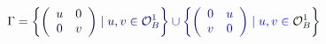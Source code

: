 \documentclass[12pt]{article}
\begin{document}
\makeatletter
\renewcommand*{\@textcolor}[3]{%
  \protect\leavevmode
  \begingroup
    \color#1{#2}#3%
  \endgroup
}
\makeatother
\begin{displaymath}
\mathcolor[RGB]{0,0,15}{\Gamma=\left\{\left(\begin{array}{cc}
u} & \mathcolor[RGB]{0,0,30}{0} \mathcolor[RGB]{0,0,45}{\\
0} & \mathcolor[RGB]{0,0,60}{v
\end{array}\right)} \mathcolor[RGB]{0,0,75}{\mid} \mathcolor[RGB]{0,0,90}{u,} \mathcolor[RGB]{0,0,105}{v} \mathcolor[RGB]{0,0,120}{\in} \mathcolor[RGB]{0,0,135}{\mathcal{O}_{B}^{1}\right\}} \mathcolor[RGB]{0,0,150}{\cup\left\{\left(\begin{array}{cc}
0} & \mathcolor[RGB]{0,0,165}{u} \mathcolor[RGB]{0,0,180}{\\
v} & \mathcolor[RGB]{0,0,195}{0
\end{array}\right)} \mathcolor[RGB]{0,0,210}{\mid} \mathcolor[RGB]{0,0,225}{u,} \mathcolor[RGB]{0,0,240}{v} \mathcolor[RGB]{0,0,255}{\in} \mathcolor[RGB]{0,15,0}{\mathcal{%
O}_{B}^{1}\right\}}
\end{displaymath}
\end{document}
